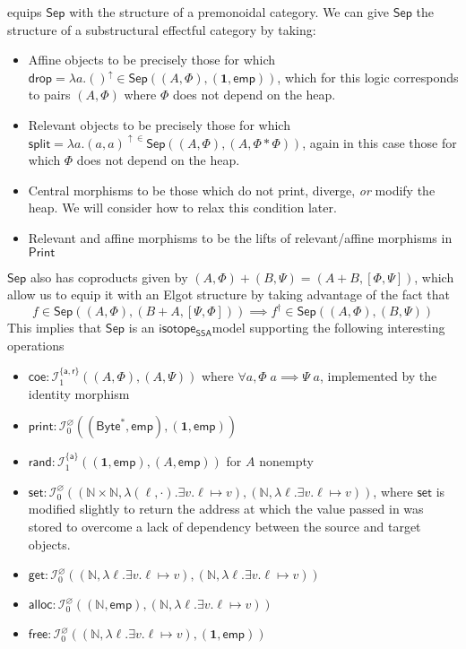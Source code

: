 \documentclass[acmsmall,screen,review]{acmart}
\newcommand{\mc}[1]{\ensuremath{\mathcal{#1}}}
\newcommand{\mb}[1]{\ensuremath{\mathbf{#1}}}
\newcommand{\ms}[1]{\ensuremath{\mathsf{#1}}}
\newcommand{\nats}{\mathbb{N}}
\newcommand{\taff}{{\{\ms{a}\}}}
\newcommand{\tint}{{\{\ms{a}, \ms{r}\}}}
\newcommand{\upg}[2]{{#1}^{\uparrow #2}}
\newcommand{\isotopessa}{\ms{isotope_{SSA}}}
\begin{document}
equips \(\ms{Sep}\) with the structure of a premonoidal category. We can give \(\ms{Sep}\) the structure of a substructural effectful category by taking:
\begin{itemize}
  \item Affine objects to be precisely those for which \(\ms{drop} =
  \upg{\lambda a. ()}{} \in \ms{Sep}((A, \Phi), (\mb{1}, \ms{emp}))\), which for
  this logic corresponds to pairs \((A, \Phi)\) where \(\Phi\) does not depend
  on the heap.
  \item Relevant objects to be precisely those for which \(\ms{split} =
  \upg{\lambda a. (a, a)} \in \ms{Sep}((A, \Phi), (A, \Phi * \Phi))\), again in
  this case those for which \(\Phi\) does not depend on the heap.
  \item Central morphisms to be those which do not print, diverge, \textit{or} modify the
  heap. We will consider how to relax this condition later.
  \item Relevant and affine morphisms to be the lifts of relevant/affine morphisms in \(\ms{Print}\)
\end{itemize}
\(\ms{Sep}\) also has coproducts given by \((A, \Phi) + (B, \Psi) = (A + B, [\Phi, \Psi])\), which allow us to equip it with an Elgot structure by taking advantage of the fact that
\begin{equation}
  f \in \ms{Sep}((A, \Phi), (B + A, [\Psi, \Phi])) \implies f^\dagger \in \ms{Sep}((A, \Phi), (B, \Psi))
\end{equation}
This implies that \(\ms{Sep}\) is an \isotopessa model supporting the following interesting operations
\begin{itemize}
  \item \(\ms{coe}: \mc{I}^\tint_1((A, \Phi), (A, \Psi))\) where \(\forall a,
  \Phi\;a \implies \Psi\;a\), implemented by the identity morphism
  \item \(\ms{print}: \mc{I}^\varnothing_0((\ms{Byte}^*, \ms{emp}), (\mb{1},
  \ms{emp}))\)
  \item \(\ms{rand}: \mc{I}^\taff_1((\mb{1}, \ms{emp}), (A, \ms{emp}))\) for \(A\) nonempty
  \item \(\ms{set}: \mc{I}^\varnothing_0((\nats \times \nats, \lambda (\ell,
  \cdot). \exists v. \ell \mapsto v), (\nats, \lambda \ell. \exists v. \ell
  \mapsto v))\), where \(\ms{set}\) is modified slightly to return the address
  at which the value passed in was stored to overcome a lack of dependency
  between the source and target objects.
  \item \(\ms{get}: \mc{I}^\varnothing_0((\nats, \lambda \ell. \exists v. \ell \mapsto v), (\nats, \lambda \ell. \exists v. \ell \mapsto v))\)
  \item \(\ms{alloc}: \mc{I}^\varnothing_0((\nats, \ms{emp}), (\nats, \lambda
  \ell. \exists v. \ell \mapsto v))\)
  \item \(\ms{free}: \mc{I}^\varnothing_0((\nats, \lambda \ell. \exists v. \ell \mapsto v), (\mb{1}, \ms{emp}))\)
\end{itemize}
\end{document}
